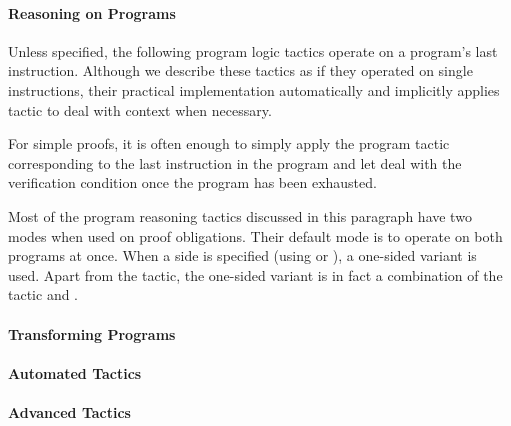 \paragraph{Reasoning on Programs}
Unless specified, the following program logic tactics operate on a
program's last instruction. Although we describe these tactics as if
they operated on single instructions, their practical implementation
automatically and implicitly applies tactic  to deal with
context when necessary.

For simple proofs, it is often enough to simply apply the program
tactic corresponding to the last instruction in the program and let
 deal with the verification condition once the program has
been exhausted.

Most of the program reasoning tactics discussed in this paragraph have
two modes when used on \prhl proof obligations. Their default mode is
to operate on both programs at once. When a side is specified (using
 or ), a one-sided variant is
used. Apart from the  tactic, the one-sided variant is in
fact a combination of the \phl tactic and .

\medskip












\paragraph{Transforming Programs}
















\paragraph{Automated Tactics}



\paragraph{Advanced Tactics}


